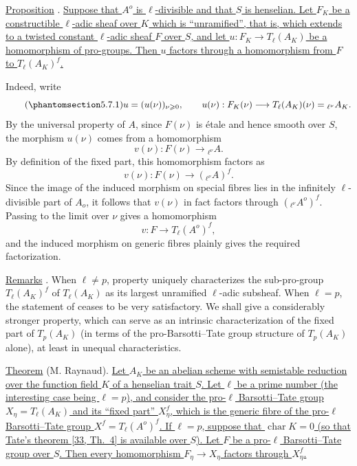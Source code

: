 \par\medskip
\noindent
\underline{Proposition} . \underline{Suppose that $A^o$ is
$\ell$-divisible and that $S$ is henselian. Let $F_K$ be a
constructible $\ell$-adic sheaf over $K$ which is ``unramified'', that
is, which extends to a twisted constant $\ell$-adic sheaf $F$ over
$S$, and let $u:F_K\longrightarrow T_\ell(A_K)$ be a homomorphism of
pro-groups. Then $u$ factors through a homomorphism from $F$ to
$T_\ell(A_K)^f$.}

Indeed, write
\begin{equation}\tag{\SGARefTarget{sga7.sga7i.eix.n5-7-1}{5.7.1}}
 u=(u(\nu))_{\nu\geqslant0},\qquad
 u(\nu):F_K(\nu)\longrightarrow T_\ell(A_K)(\nu)
 ={}_{\ell^\nu}A_K.
\end{equation}
By the universal property of $A$, since $F(\nu)$ is \'{e}tale and
hence smooth over $S$, the morphism $u(\nu)$ comes from a
homomorphism
\[
 v(\nu):F(\nu)\longrightarrow{}_{\ell^\nu}A.
\]
By definition of the fixed part, this homomorphism factors as
\[
 v(\nu):F(\nu)\longrightarrow({}_{\ell^\nu}A)^f.
\]
Since the image of the induced morphism on special fibres lies in the
infinitely $\ell$-divisible part of $A_o$, it follows that $v(\nu)$
in fact factors through $({}_{\ell^\nu}A^o)^f$. Passing to the limit
over $\nu$ gives a homomorphism
\[
 v:F\longrightarrow T_\ell(A^o)^f,
\]
and the induced morphism on generic fibres plainly gives the required
factorization.

\medskip
\noindent
\underline{Remarks} . When $\ell\neq p$, property  uniquely
characterizes the sub-pro-group $T_\ell(A_K)^f$ of $T_\ell(A_K)$ as
its largest unramified $\ell$-adic subsheaf. When $\ell=p$, the
statement of  ceases to be very satisfactory. We shall give a
considerably stronger property, which can serve as an intrinsic
characterization of the fixed part of $T_p(A_K)$ (in terms of the
pro-Barsotti--Tate group structure of $T_p(A_K)$ alone), at least in
unequal characteristics.

\medskip
\noindent
\underline{Theorem}  (M. Raynaud). \underline{Let $A_K$ be an
abelian scheme with semistable reduction over the function field $K$
of a henselian trait $S$. Let $\ell$ be a prime number (the
interesting case being $\ell=p$), and consider the pro-$\ell$
Barsotti--Tate group $X_\eta=T_\ell(A_K)$ and its ``fixed part''
$X_\eta^f$, which is the generic fibre of the pro-$\ell$
Barsotti--Tate group $X^f=T_\ell(A^o)^f$. If $\ell=p$, suppose that
$\operatorname{char}K=0$ (so that Tate's theorem [33, Th.\ 4] is
available over $S$). Let $F$ be a pro-$\ell$ Barsotti--Tate group over
$S$. Then every homomorphism $F_\eta\longrightarrow X_\eta$ factors
through $X_\eta^f$.}

